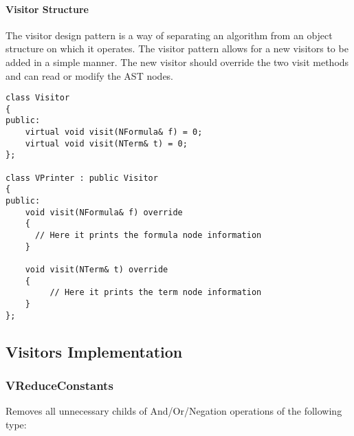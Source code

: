 \documentclass{article}
\begin{document}
			\paragraph{Visitor Structure} The visitor design pattern is a way of separating an algorithm from an object structure on which it operates. 
				The visitor pattern allows for a new visitors to be added in a simple manner.
				The new visitor should override the two visit methods and can read or modify the AST nodes.
				
				\begin{lstlisting}
class Visitor
{
public:
    virtual void visit(NFormula& f) = 0;
    virtual void visit(NTerm& t) = 0;
};

class VPrinter : public Visitor
{
public:
    void visit(NFormula& f) override 
    {
	  // Here it prints the formula node information 
    }

    void visit(NTerm& t) override 
    { 
         // Here it prints the term node information 
    }
};
				\end{lstlisting}

		\subsection{Visitors Implementation}
		\label{sec:visitors-implementation}
			\subsubsection*{VReduceConstants}
				Removes all unnecessary childs of And/Or/Negation operations of the following type:
		
\end{document}

